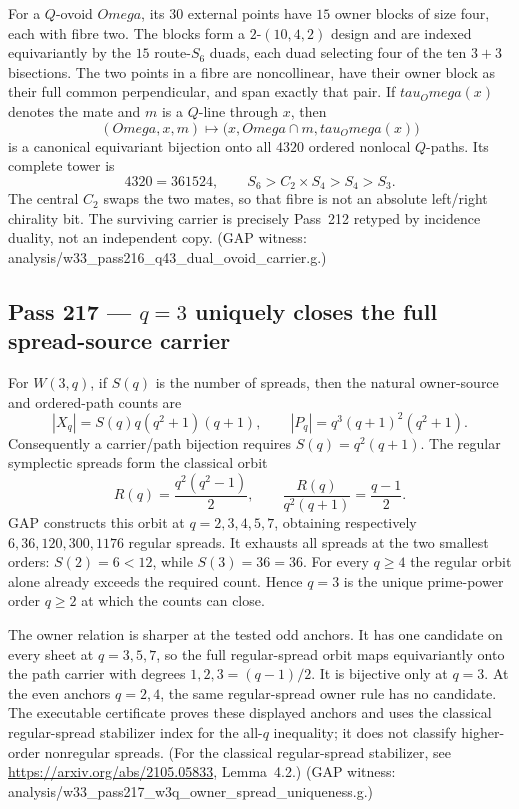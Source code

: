 \documentclass[12pt,a4paper]{article}
\def\texttt#1{#1}%
\def\tau{tau}%
\def\Omega{Omega}%
\def\cdot{ }%
\theoremstyle{definition}
\begin{document}
For a $Q$-ovoid $\Omega$, its $30$ external points have $15$ owner blocks
of size four, each with fibre two.  The blocks form a $2$-$(10,4,2)$ design
and are indexed equivariantly by the $15$ route-$S_6$ duads, each duad
selecting four of the ten $3{+}3$ bisections.  The two points in a fibre are
noncollinear, have their owner block as their full common perpendicular, and
span exactly that pair.  If
$\tau_\Omega(x)$ denotes the mate and $m$ is a $Q$-line through $x$, then
\[
 (\Omega,x,m)\longmapsto
 \bigl(x,\Omega\cap m,\tau_\Omega(x)\bigr)
\]
is a canonical equivariant bijection onto all $4320$ ordered nonlocal
$Q$-paths.  Its complete tower is
\[
 4320=36\cdot15\cdot2\cdot4,
 \qquad
 S_6>C_2\times S_4>S_4>S_3.
\]
The central $C_2$ swaps the two mates, so that fibre is not an absolute
left/right chirality bit.  The surviving carrier is precisely Pass~212
retyped by incidence duality, not an independent copy.
(GAP witness:
\texttt{analysis/w33\_pass216\_q43\_dual\_ovoid\_carrier.g}.)

\subsection{Pass 217 --- $q=3$ uniquely closes the full spread-source carrier}
\label{ssec:pass217}

For $W(3,q)$, if $S(q)$ is the number of spreads, then the natural
owner-source and ordered-path counts are
\[
 |X_q|=S(q)q(q^2+1)(q+1),
 \qquad
 |P_q|=q^3(q+1)^2(q^2+1).
\]
Consequently a carrier/path bijection requires
$S(q)=q^2(q+1)$.  The regular symplectic spreads form the classical orbit
\[
 R(q)=\frac{q^2(q^2-1)}2,
 \qquad
 \frac{R(q)}{q^2(q+1)}=\frac{q-1}{2}.
\]
GAP constructs this orbit at $q=2,3,4,5,7$, obtaining respectively
$6,36,120,300,1176$ regular spreads.  It exhausts all spreads at the two
smallest orders: $S(2)=6<12$, while $S(3)=36=36$.  For every $q\ge4$ the
regular orbit alone already exceeds the required count.  Hence $q=3$ is the
unique prime-power order $q\ge2$ at which the counts can close.

The owner relation is sharper at the tested odd anchors.  It has one candidate
on every sheet at $q=3,5,7$, so the full regular-spread orbit maps equivariantly
onto the path carrier with degrees $1,2,3=(q-1)/2$.  It is bijective only at
$q=3$.  At the even anchors $q=2,4$, the same regular-spread owner rule has
no candidate.  The executable certificate proves these displayed anchors
and uses the classical regular-spread stabilizer index for the all-$q$
inequality; it does not classify higher-order nonregular spreads.
(For the classical regular-spread stabilizer, see
\url{https://arxiv.org/abs/2105.05833}, Lemma~4.2.)
(GAP witness:
\texttt{analysis/w33\_pass217\_w3q\_owner\_spread\_uniqueness.g}.)
\end{document}
